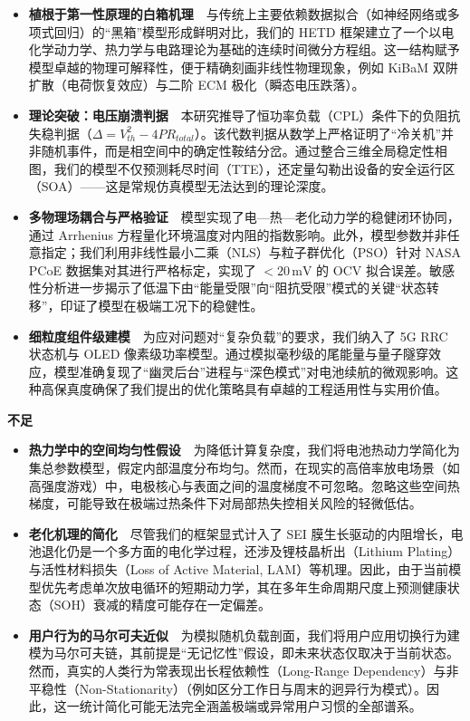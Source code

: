 \documentclass[11pt,a4paper]{ctexart}
\begin{document}
\begin{itemize}[leftmargin=1.6em,itemsep=0.5em]
\item \textbf{植根于第一性原理的白箱机理}　与传统上主要依赖数据拟合（如神经网络或多项式回归）的“黑箱”模型形成鲜明对比，我们的 HETD 框架建立了一个以电化学动力学、热力学与电路理论为基础的连续时间微分方程组。这一结构赋予模型卓越的物理可解释性，便于精确刻画非线性物理现象，例如 KiBaM 双阱扩散（电荷恢复效应）与二阶 ECM 极化（瞬态电压跌落）。

\item \textbf{理论突破：电压崩溃判据}　本研究推导了恒功率负载（CPL）条件下的负阻抗失稳判据（$\Delta = V_{th}^2 - 4PR_{total}$）。该代数判据从数学上严格证明了“冷关机”并非随机事件，而是相空间中的确定性鞍结分岔。通过整合三维全局稳定性相图，我们的模型不仅预测耗尽时间（TTE），还定量勾勒出设备的安全运行区（SOA）——这是常规仿真模型无法达到的理论深度。

\item \textbf{多物理场耦合与严格验证}　模型实现了电—热—老化动力学的稳健闭环协同，通过 Arrhenius 方程量化环境温度对内阻的指数影响。此外，模型参数并非任意指定；我们利用非线性最小二乘（NLS）与粒子群优化（PSO）针对 NASA PCoE 数据集对其进行严格标定，实现了 $< 20\,\mathrm{mV}$ 的 OCV 拟合误差。敏感性分析进一步揭示了低温下由“能量受限”向“阻抗受限”模式的关键“状态转移”，印证了模型在极端工况下的稳健性。

\item \textbf{细粒度组件级建模}　为应对问题对“复杂负载”的要求，我们纳入了 5G RRC 状态机与 OLED 像素级功率模型。通过模拟毫秒级的尾能量与量子隧穿效应，模型准确复现了“幽灵后台”进程与“深色模式”对电池续航的微观影响。这种高保真度确保了我们提出的优化策略具有卓越的工程适用性与实用价值。
\end{itemize}

\noindent\textbf{不足}

\begin{itemize}[leftmargin=1.6em,itemsep=0.5em]
\item \textbf{热力学中的空间均匀性假设}　为降低计算复杂度，我们将电池热动力学简化为集总参数模型，假定内部温度分布均匀。然而，在现实的高倍率放电场景（如高强度游戏）中，电极核心与表面之间的温度梯度不可忽略。忽略这些空间热梯度，可能导致在极端过热条件下对局部热失控相关风险的轻微低估。

\item \textbf{老化机理的简化}　尽管我们的框架显式计入了 SEI 膜生长驱动的内阻增长，电池退化仍是一个多方面的电化学过程，还涉及锂枝晶析出（Lithium Plating）与活性材料损失（Loss of Active Material, LAM）等机理。因此，由于当前模型优先考虑单次放电循环的短期动力学，其在多年生命周期尺度上预测健康状态（SOH）衰减的精度可能存在一定偏差。

\item \textbf{用户行为的马尔可夫近似}　为模拟随机负载剖面，我们将用户应用切换行为建模为马尔可夫链，其前提是“无记忆性”假设，即未来状态仅取决于当前状态。然而，真实的人类行为常表现出长程依赖性（Long-Range Dependency）与非平稳性（Non-Stationarity）（例如区分工作日与周末的迥异行为模式）。因此，这一统计简化可能无法完全涵盖极端或异常用户习惯的全部谱系。
\end{itemize}
\end{document}
